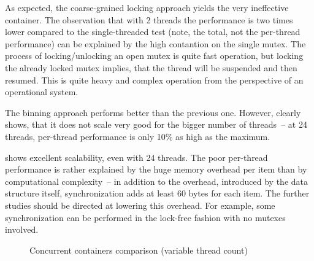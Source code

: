 As expected, the coarse-grained locking approach yields the very ineffective container. The observation that with 2 threads the performance is two times lower compared to the single-threaded test (note, the total, not the per-thread performance) can be explained by the high contantion on the single mutex. The process of locking/unlocking an open mutex is quite fast operation, but locking the already locked mutex implies, that the thread will be suspended and then resumed. This is quite heavy and complex operation from the perspective of an operational system.

The binning approach performs better than the previous one. However,  clearly shows, that it does not scale very good for the bigger number of threads~-- at 24 threads, per-thread performance is only 10\% as high as the maximum.

\cndcname shows excellent scalability, even with 24 threads. The poor per-thread performance is rather explained by the huge memory overhead per item than by computational complexity~-- in addition to the overhead, introduced by the data structure itself, synchronization adds at least 60 bytes for each item. The further studies should be directed at lowering this overhead. For example, some synchronization can be performed in the lock-free fashion with no mutexes involved.

\begin{figure}
\centering
    \label{f4}
\caption{Concurrent containers comparison (variable thread count)}
\end{figure}

